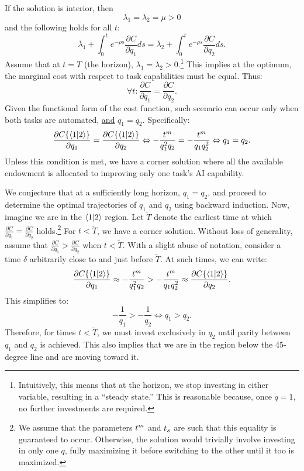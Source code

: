 \documentclass{article}
\theoremstyle{plain}
\theoremstyle{plain}
\begin{document}
If the solution is interior, then  
\[
\lambda_{1}=\lambda_{2}=\mu>0
\]
and the following holds for all $t$:
\[
\bar{\lambda}_{1}+\int_{0}^{t}e^{-\rho s}\frac{\partial C}{\partial q_{1}}ds=\bar{\lambda}_{2}+\int_{0}^{t}e^{-\rho s}\frac{\partial C}{\partial q_{2}}ds.
\]
Assume that at $t=T$ (the horizon), $\lambda_{1}=\lambda_{2}>0$.\footnote{Intuitively, this means that at the horizon, we stop investing in either variable, resulting in a ``steady state.''  
This is reasonable because, once $q=1$, no further investments are required.}  
This implies at the optimum, the marginal cost with respect to task capabilities must be equal.  
Thus:
\[
\forall t:\frac{\partial C}{\partial q_{1}}=\frac{\partial C}{\partial q_{2}}.
\]
Given the functional form of the cost function, such scenario can occur only when both tasks are automated, \underline{and} $q_{1}=q_{2}$.  
Specifically:
\[
\frac{\partial C\{\langle 1|2 \rangle\}}{\partial q_{1}}=\frac{\partial C\{\langle 1|2 \rangle\}}{\partial q_{2}}\Leftrightarrow-\frac{t^{m}_{}}{q_{1}^{2}q_{2}}=-\frac{t^{m}_{}}{q_{1}q_{2}^{2}}\Leftrightarrow q_{1}=q_{2}.
\]
Unless this condition is met, we have a corner solution where all the available endowment is allocated to improving only one task’s AI capability.

We conjecture that at a sufficiently long horizon, $q_{1}=q_{2}$, and proceed to determine the optimal trajectories of $q_{1}$ and $q_{2}$ using backward induction.  
Now, imagine we are in the $\langle 1|2 \rangle$ region.  
Let $\tilde{T}$ denote the earliest time at which $\frac{\partial C}{\partial q_{1}}=\frac{\partial C}{\partial q_{2}}$ holds.\footnote{We assume that the parameters $t^{m}_{}$ and $t_{s}$ are such that this equality is guaranteed to occur.  
Otherwise, the solution would trivially involve investing in only one $q$, fully maximizing it before switching to the other until it too is maximized.}  
For $t<\tilde{T}$, we have a corner solution.  
Without loss of generality, assume that $\frac{\partial C}{\partial q_{1}}>\frac{\partial C}{\partial q_{2}}$ when $t<\tilde{T}$.  
With a slight abuse of notation, consider a time $\delta$ arbitrarily close to and just before $\tilde{T}$.  
At such times, we can write:
\[
\frac{\partial C\{\langle 1|2 \rangle\}}{\partial q_{1}}\approx-\frac{t^{m}_{}}{q_{1}^{2}q_{2}}>-\frac{t^{m}_{}}{q_{1}q_{2}^{2}}\approx\frac{\partial C\{\langle 1|2 \rangle\}}{\partial q_{2}}.
\]
This simplifies to:
\[
-\frac{1}{q_{1}}>-\frac{1}{q_{2}}\Leftrightarrow q_{1}>q_{2}.
\]
Therefore, for times $t<\tilde{T}$, we must invest exclusively in $q_{2}$ until parity between $q_{1}$ and $q_{2}$ is achieved.  
This also implies that we are in the region below the 45-degree line and are moving toward it.
\end{document}
